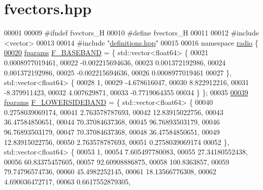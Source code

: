 \hypertarget{fvectors_8hpp_source}{\section{fvectors.\+hpp}
\label{fvectors_8hpp_source}
}

\begin{DoxyCode}
00001 
00009 \textcolor{preprocessor}{#ifndef fvectors\_H}
00010 \textcolor{preprocessor}{#define fvectors\_H}
00011 
00012 \textcolor{preprocessor}{#include <vector>}
00013 
00014 \textcolor{preprocessor}{#include "\hyperlink{definitions_8hpp}{definitions.hpp}"}
00015 
00016 \textcolor{keyword}{namespace }\hyperlink{namespaceradio}{radio} \{
\hypertarget{fvectors_8hpp_source_l00020}{}\hyperlink{namespaceradio_a9bd902e9216499953a5906de73dc1796}{00020}     \hyperlink{definitions_8hpp_a7615684c2af56be5f302c5b367d71f6b}{fparams} \hyperlink{namespaceradio_a9bd902e9216499953a5906de73dc1796}{F\_BASEBAND} = \{ std::vector<float64> \{
00021         0.0008977019461,
00022             -0.002215694636,
00023             0.001372192986,
00024             0.001372192986,
00025             -0.002215694636,
00026             0.0008977019461 
00027     \}, std::vector<float64> \{
00028         1,
00029             -4.678616047,
00030             8.822912216,
00031             -8.379911423,
00032             4.007629871,
00033             -0.7719064355
00034     \} \};
00035 
\hypertarget{fvectors_8hpp_source_l00039}{}\hyperlink{namespaceradio_a0ffd57d5a11ff70a1f55dbdc8ebe098d}{00039}     \hyperlink{definitions_8hpp_a7615684c2af56be5f302c5b367d71f6b}{fparams} \hyperlink{namespaceradio_a0ffd57d5a11ff70a1f55dbdc8ebe098d}{F\_LOWERSIDEBAND} = \{ std::vector<float64> \{
00040         0.2758039069174,   
00041             2.763578787693,   
00042             12.83915022756,   
00043             36.47584850651,
00044             70.37084637368,   
00045             96.76893503179,   
00046             96.76893503179,   
00047             70.37084637368,
00048             36.47584850651,   
00049             12.83915022756,   
00050             2.763578787693,  
00051             0.2758039069174   
00052     \}, std::vector<float64> \{
00053         1,
00054             7.605497780083,   
00055             27.34180552438,   
00056             60.83375457605,
00057             92.60908886875,       
00058             100.8363857,    
00059             79.74796574736,     
00060             45.4982252145,
00061             18.13566776308,    
00062             4.690036472717,   
00063             0.6617552879305,   

\end{DoxyCode}
